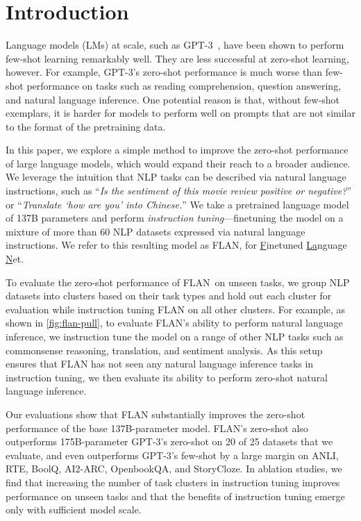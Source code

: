 \documentclass{article} %
\newcommand{\flan}{FLAN}
\begin{document}
\section{Introduction}

Language models (LMs) at scale, such as GPT-3~\citep{brown2020language}, have been shown to perform few-shot learning remarkably well. 
They are less successful at zero-shot learning, however.
For example, GPT-3's zero-shot performance is much worse than few-shot performance on tasks such as reading comprehension, question answering, and natural language inference. 
One potential reason is that, without few-shot exemplars, it is harder for models to perform well on prompts that are not similar to the format of the pretraining data.

In this paper, we explore a simple method to improve the zero-shot performance of large language models, which would expand their reach to a broader audience.
We leverage the intuition that NLP tasks can be described via natural language instructions, such as ``\textit{Is the sentiment of this movie review positive or negative?}'' or ``\textit{Translate `how are you' into Chinese.}''
We take a pretrained language model of 137B parameters and perform \textit{instruction tuning}---finetuning the model on a mixture of more than 60 NLP datasets expressed via natural language instructions.
We refer to this resulting model as \flan, for \underline{F}inetuned \underline{La}nguage \underline{N}et.

To evaluate the zero-shot performance of \flan\ on unseen tasks, we group NLP datasets into clusters based on their task types and hold out each cluster for evaluation while instruction tuning \flan{} on all other clusters.
For example, as shown in \cref{fig:flan-pull}, to evaluate \flan's ability to perform natural language inference, we instruction tune the model on a range of other NLP tasks such as commonsense reasoning, translation, and sentiment analysis.
As this setup ensures that \flan{} has not seen any natural language inference tasks in instruction tuning, we then evaluate its ability to perform zero-shot natural language inference.

Our evaluations show that \flan{} substantially improves the zero-shot performance of the base 137B-parameter model.
\flan's zero-shot also outperforms 175B-parameter GPT-3's zero-shot on 20 of 25 datasets that we evaluate, and even outperforms GPT-3's few-shot by a large margin on ANLI, RTE, BoolQ, AI2-ARC, OpenbookQA, and StoryCloze. 
In ablation studies, we find that increasing the number of task clusters in instruction tuning improves performance on unseen tasks and that the benefits of instruction tuning emerge only with sufficient model scale. 
\end{document}
